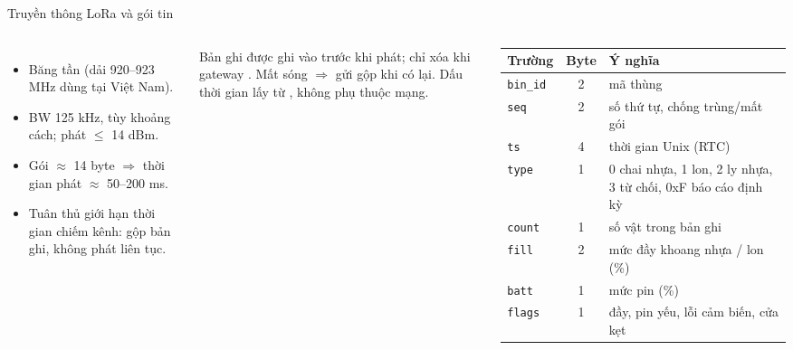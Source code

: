 \documentclass[aspectratio=169,10pt,t]{beamer}
\begin{document}
\begin{frame}{Truyền thông LoRa và gói tin}
\footnotesize
\begin{columns}[T]
\begin{itemize}\setlength\itemsep{1pt}\scriptsize
  \item Băng tần  (dải 920--923 MHz dùng tại Việt Nam).
  \item BW 125 kHz,  tùy khoảng cách; phát $\le$ 14 dBm.
  \item Gói $\approx$ 14 byte $\Rightarrow$ thời gian phát $\approx$ 50--200 ms.
  \item Tuân thủ giới hạn thời gian chiếm kênh: gộp bản ghi, không phát liên tục.
\end{itemize}\vskip3pt
\scriptsize
Bản ghi được ghi vào  trước khi phát; chỉ xóa khi gateway . Mất sóng $\Rightarrow$ gửi gộp khi có lại.
Dấu thời gian lấy từ , không phụ thuộc mạng.\par\vskip4pt
\centering
{}
\scriptsize
\begin{tabularx}{\linewidth}{@{}l c X@{}}
\toprule
\textbf{Trường} & \textbf{Byte} & \textbf{Ý nghĩa}\\\midrule
\texttt{bin\_id} & 2 & mã thùng\\
\texttt{seq} & 2 & số thứ tự, chống trùng/mất gói\\
\texttt{ts} & 4 & thời gian Unix (RTC)\\
\texttt{type} & 1 & 0 chai nhựa, 1 lon, 2 ly nhựa, 3 từ chối, 0xF báo cáo định kỳ\\
\texttt{count} & 1 & số vật trong bản ghi\\
\texttt{fill} & 2 & mức đầy khoang nhựa / lon (\%)\\
\texttt{batt} & 1 & mức pin (\%)\\
\texttt{flags} & 1 & đầy, pin yếu, lỗi cảm biến, cửa kẹt\\
\bottomrule
\end{tabularx}\vskip3pt
\end{columns}
\end{frame}
\end{document}
